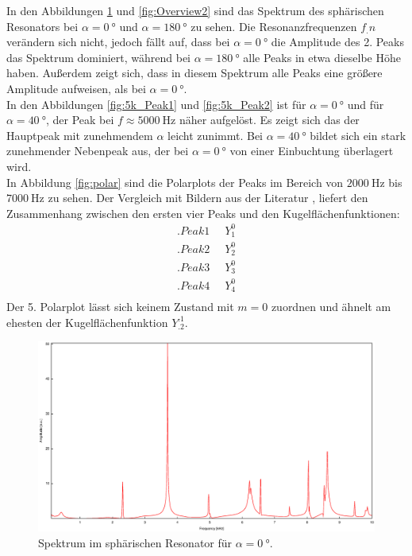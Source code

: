 In den Abbildungen \ref{fig:Overview1} und \ref{fig:Overview2} sind das Spektrum des sphärischen Resonators bei $\alpha=\SI{0}{\degree}$ und $\alpha=\SI{180}{\degree}$
zu sehen.
Die Resonanzfrequenzen $f_.n$ verändern sich nicht, jedoch fällt auf, dass bei $\alpha=\SI{0}{\degree}$ die Amplitude des 2. Peaks das Spektrum dominiert, während bei $\alpha=\SI{180}{\degree}$ alle Peaks in etwa dieselbe Höhe haben. Außerdem zeigt sich, dass in diesem Spektrum alle Peaks eine größere Amplitude aufweisen, als bei $\alpha=\SI{0}{\degree}$.\\
In den Abbildungen \ref{fig:5k_Peak1} und \ref{fig:5k_Peak2} ist für $\alpha=\SI{0}{\degree}$ und für $\alpha=\SI{40}{\degree}$, der Peak bei $f\approx\SI{5000}{\hertz}$ näher aufgelöst.
Es zeigt sich das der Hauptpeak mit zunehmendem $\alpha$ leicht zunimmt. Bei $\alpha=\SI{40}{\degree}$ bildet sich ein stark zunehmender Nebenpeak aus, der bei $\alpha=\SI{0}{\degree}$ von einer Einbuchtung überlagert wird.\\
In Abbildung \ref{fig:polar} sind die Polarplots der Peaks im Bereich von $\SI{2000}{\hertz}$ bis $\SI{7000}{\hertz}$ zu sehen.
Der Vergleich mit Bildern aus der Literatur \cite{V23}, liefert den Zusammenhang zwischen den ersten vier Peaks und den Kugelflächenfunktionen:
\begin{align*}
.{Peak 1}&\mathop{\widehat{=}} Y^0_1\\
.{Peak 2}&\mathop{\widehat{=}} Y^0_2\\
.{Peak 3}&\mathop{\widehat{=}} Y^0_3\\
.{Peak 4}&\mathop{\widehat{=}} Y^0_4\\
\end{align*}
Der 5. Polarplot lässt sich keinem Zustand mit $m=0$ zuordnen und ähnelt am ehesten der Kugelflächenfunktion $Y^.1_.2$.

\begin{figure}
\centering
\includegraphics[width=\linewidth-60pt,height=\textheight-60pt,keepaspectratio]{FP-V23data/2.1_0degree.eps}
\caption{Spektrum im sphärischen Resonator für $\alpha=\SI{0}{\degree}$.}
\label{fig:Overview1}
\end{figure}

